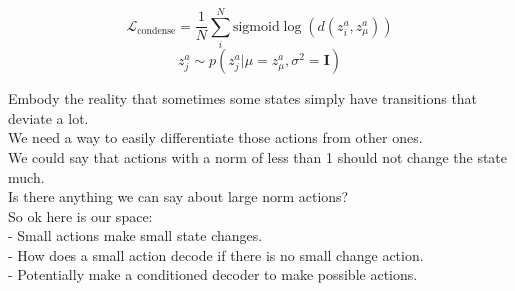 \documentclass{article}
\begin{document}
$$\mathcal{L}_\text{condense} = \frac{1}{N}\sum\limits_i^N \text{sigmoid}\log(d({z^a_i}, {z^a_\mu}))$$
$$z^a_j \sim p(z^a_j | \mu=z^a_\mu, \sigma^2=\mathbf{I})$$



Embody the reality that sometimes some states simply have transitions that deviate a lot.\\
We need a way to easily differentiate those actions from other ones.\\
We could say that actions with a norm of less than 1 should not change the state much.\\
Is there anything we can say about large norm actions?\\

So ok here is our space:\\

- Small actions make small state changes.\\
- How does a small action decode if there is no small change action.\\
- Potentially make a conditioned decoder to make possible actions.
\end{document}
